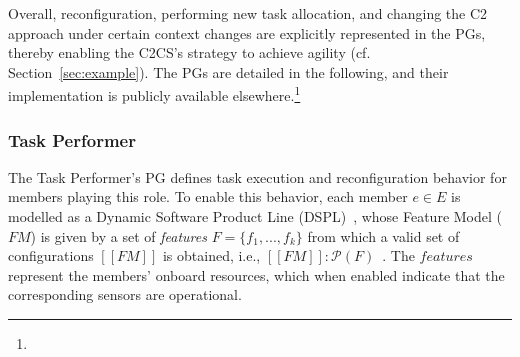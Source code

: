 


Overall, reconfiguration, performing new task allocation, and changing the C2 approach under certain context changes are explicitly represented in the PGs, \color{black}thereby enabling the C2CS's strategy \color{black} to achieve agility (cf. Section~\ref{sec:example}). The PGs are detailed in the following, and their implementation is publicly available elsewhere.\footnote{\implementation}


\subsubsection{Task Performer}

The Task Performer's PG defines task execution and reconfiguration behavior for members playing this role. To enable this behavior, each member $e \in E$ is modelled as a Dynamic Software Product Line (DSPL)~\citep{Hallsteinsen2008}, whose Feature Model ($FM$) is given by a set of \textit{features} $F=\{f_1, ...,f_k\}$ from which a valid set of configurations $[\![FM]\!]$ is obtained, i.e., $[\![FM]\!]: \mathcal{P}(F)$~\citep{Schobbens2006FeatureDA, Kang1990}. The $features$ represent the members’ onboard  resources, which when enabled indicate that the corresponding sensors are operational.

